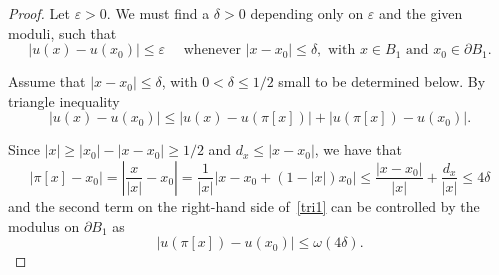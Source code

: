 \documentclass[letter,11pt]{amsart}
\newcommand{\vep}{\varepsilon}
\theoremstyle{definition}
\numberwithin{equation}{section}
\begin{document}
\begin{proof}
Let $\vep > 0$.
We must find a $\delta > 0$ depending only on $\vep$ and the given moduli, such that
\begin{equation}
\label{tri0}
|u(x) - u(x_0)| \leq \vep \quad \text{ whenever } |x - x_0| \leq \delta, \text{ with } x \in B_1 \text{ and } x_0 \in \partial B_1.
\end{equation}

\medskip

Assume that $|x - x_0| \leq \delta$, with $0 < \delta \leq 1/2$ small to be determined below.
By triangle inequality
\begin{equation}
\label{tri1}
|u(x) - u(x_0)| \leq |u(x) - u(\pi[x])| + |u(\pi[x]) - u(x_0)|.
\end{equation}

Since $|x| \geq |x_0| - |x- x_0| \geq 1/2$ and $d_x \leq |x- x_0|$, we have  that
\[
|\pi[x] - x_0 | = 
\left|\frac{x}{|x|} - x_0\right| 
= \frac{1}{|x|}\big|x - x_0 + (1-|x|) x_0\big|
\leq \frac{|x- x_0|}{|x|} +\frac{d_x}{|x|}
\leq 4 \delta
\]
and the second term on the right-hand side of~\eqref{tri1} can be controlled by the modulus on $\partial B_1$ as
\begin{equation}
\label{tri2}
|u(\pi[x]) - u(x_0)| \leq \omega(4 \delta).
\end{equation}

\medskip


\end{proof}
\end{document}
